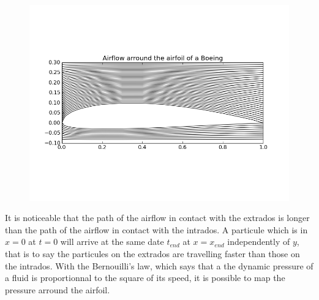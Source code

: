 \documentclass{article}
\begin{document}
\begin{figure}[h]
  \includegraphics[width=12cm]{boeing_airflow}
\end{figure}

It is noticeable that the path of the airflow in contact with the extrados is longer than the path of the airflow in contact with the intrados. A particule which is in $x = 0$ at $t = 0$ will arrive at the same date $t_{end}$ at $x = x_{end}$ independently of $y$, that is to say the particules on the extrados are travelling faster than those on the intrados. With the Bernouilli's law, which says that a the dynamic pressure of a fluid is proportionnal to the square of its speed, it is possible to map the pressure arround the airfoil.
\end{document}
